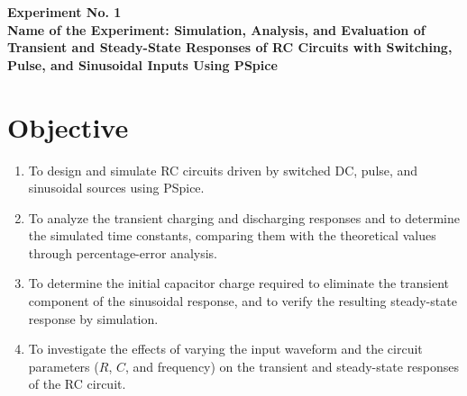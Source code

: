 \documentclass[12pt,a4paper]{article}
\newcommand{\expnumber}{1}
\begin{document}
	
	
	
	
	\begin{center}
		{\fontsize{14}{18}\selectfont\bfseries Experiment No. \expnumber}\\[4pt]
		{\fontsize{14}{18}\selectfont\bfseries Name of the Experiment: Simulation, Analysis, and
			Evaluation of Transient and Steady-State Responses of RC Circuits
			with Switching, Pulse, and Sinusoidal Inputs Using PSpice}
	\end{center}
	\vspace{6pt}
	
	\section{Objective}
	\begin{enumerate}[label=\roman*., leftmargin=2.5em]
		\item To design and simulate RC circuits driven by switched DC,
		pulse, and sinusoidal sources using PSpice.
		\item To analyze the transient charging and discharging responses and
		to determine the simulated time constants, comparing them with
		the theoretical values through percentage-error analysis.
		\item To determine the initial capacitor charge required to
		eliminate the transient component of the sinusoidal response,
		and to verify the resulting steady-state response by
		simulation.
		\item To investigate the effects of varying the input waveform and
		the circuit parameters ($R$, $C$, and frequency) on the
		transient and steady-state responses of the RC circuit.
	\end{enumerate}
	
\end{document}

